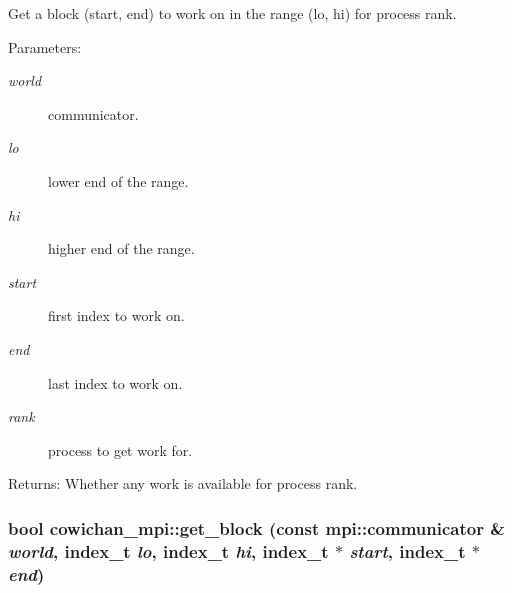 Get a block (start, end) to work on in the range (lo, hi) for process rank. \begin{Desc}
\item[Parameters:]
\begin{description}
\item[{\em world}]communicator. \item[{\em lo}]lower end of the range. \item[{\em hi}]higher end of the range. \item[{\em start}]first index to work on. \item[{\em end}]last index to work on. \item[{\em rank}]process to get work for. \end{description}
\end{Desc}
\begin{Desc}
\item[Returns:]Whether any work is available for process rank. \end{Desc}
\hypertarget{namespacecowichan__mpi_bb7c07d8b23660efe06c7ee12d60bbdc}{
\subsubsection[{get\_\-block}]{\setlength{\rightskip}{0pt plus 5cm}bool cowichan\_\-mpi::get\_\-block (const mpi::communicator \& {\em world}, \/  {\bf index\_\-t} {\em lo}, \/  {\bf index\_\-t} {\em hi}, \/  {\bf index\_\-t} $\ast$ {\em start}, \/  {\bf index\_\-t} $\ast$ {\em end})}}
\label{namespacecowichan__mpi_bb7c07d8b23660efe06c7ee12d60bbdc}


